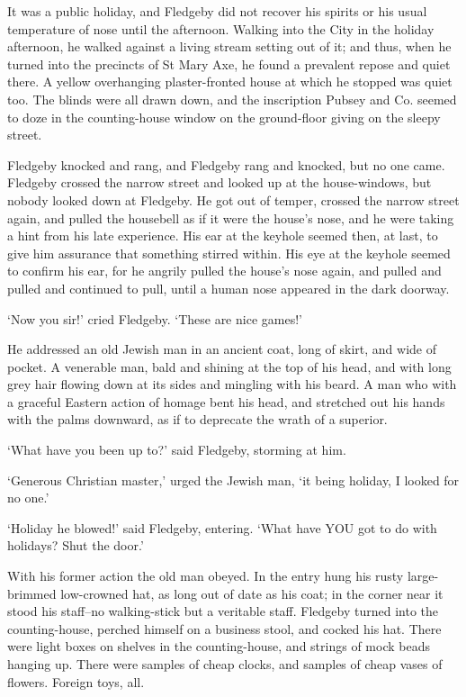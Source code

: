 It was a public holiday, and Fledgeby did not recover his spirits or his
usual temperature of nose until the afternoon. Walking into the City in
the holiday afternoon, he walked against a living stream setting out of
it; and thus, when he turned into the precincts of St Mary Axe, he found
a prevalent repose and quiet there. A yellow overhanging plaster-fronted
house at which he stopped was quiet too. The blinds were all drawn down,
and the inscription Pubsey and Co. seemed to doze in the counting-house
window on the ground-floor giving on the sleepy street.

Fledgeby knocked and rang, and Fledgeby rang and knocked, but no
one came. Fledgeby crossed the narrow street and looked up at the
house-windows, but nobody looked down at Fledgeby. He got out of temper,
crossed the narrow street again, and pulled the housebell as if it were
the house’s nose, and he were taking a hint from his late experience.
His ear at the keyhole seemed then, at last, to give him assurance that
something stirred within. His eye at the keyhole seemed to confirm his
ear, for he angrily pulled the house’s nose again, and pulled and pulled
and continued to pull, until a human nose appeared in the dark doorway.

‘Now you sir!’ cried Fledgeby. ‘These are nice games!’

He addressed an old Jewish man in an ancient coat, long of skirt, and
wide of pocket. A venerable man, bald and shining at the top of his
head, and with long grey hair flowing down at its sides and mingling
with his beard. A man who with a graceful Eastern action of homage bent
his head, and stretched out his hands with the palms downward, as if to
deprecate the wrath of a superior.

‘What have you been up to?’ said Fledgeby, storming at him.

‘Generous Christian master,’ urged the Jewish man, ‘it being holiday, I
looked for no one.’

‘Holiday he blowed!’ said Fledgeby, entering. ‘What have YOU got to do
with holidays? Shut the door.’

With his former action the old man obeyed. In the entry hung his rusty
large-brimmed low-crowned hat, as long out of date as his coat; in the
corner near it stood his staff--no walking-stick but a veritable staff.
Fledgeby turned into the counting-house, perched himself on a business
stool, and cocked his hat. There were light boxes on shelves in the
counting-house, and strings of mock beads hanging up. There were samples
of cheap clocks, and samples of cheap vases of flowers. Foreign toys,
all.

